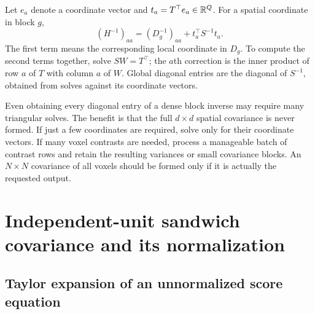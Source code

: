 Let $e_a$ denote a coordinate vector and $t_a=T^\top e_a\in\mathbb R^Q$.
For a spatial coordinate in block $g$,
\begin{equation}
 (H^{-1})_{aa}=(D_g^{-1})_{aa}+t_a^\top S^{-1}t_a .
 \label{cov-diagonal-entry}
\end{equation}
The first term means the corresponding local coordinate in $D_g$.
To compute the second terms together, solve $SW=T^\top$;
the $a$th correction is the inner product of row $a$ of $T$
with column $a$ of $W$.  Global diagonal entries are the diagonal
of $S^{-1}$, obtained from solves against its coordinate vectors.

Even obtaining every diagonal entry of a dense block inverse may require
many triangular solves.  The benefit is that the full $d\times d$
spatial covariance is never formed.  If just a few coordinates are
required, solve only for their coordinate vectors.  If many voxel
contrasts are needed, process a manageable batch of contrast rows and
retain the resulting variances or small covariance blocks.  An
$N\times N$ covariance of all voxels should be formed only if it is
actually the requested output.

\section{Independent-unit sandwich covariance and its normalization}
\label{cov-sandwich}

\subsection{Taylor expansion of an unnormalized score equation}
\label{cov-sandwich-taylor}

